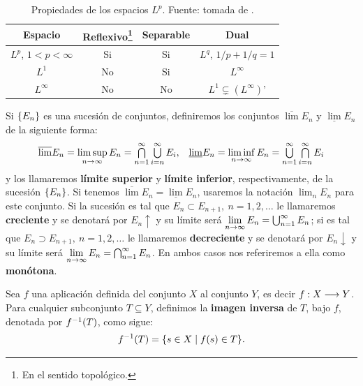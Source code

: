 
\begin{table}[ht]
\caption[título optativo de la tabla]{Propiedades de los espacios $L^p$. Fuente: tomada de \cite[Cap. 3]{Brez}.}\label{tablaLp}
\centering
\begin{tabular}{cccc}
\hline
Espacio & Reflexivo\footnote{En el sentido topológico.} & Separable & Dual \\ \hline %
$L^p$, $1<p<\infty$  & Si & Si & $L^q$, $1/p+1/q=1$ \\
$L^1$ & No & Si & $L^\infty$ \\
$L^\infty$ & No & No & $L^1 \varsubsetneq (L^\infty)’$ \\ \hline
\end{tabular}
\end{table} 

\begin{defn}\label{dfcp1}Si $\su En$ es una sucesión de
conjuntos, definiremos los conjuntos $\overline{\lim } E_n$ y
$\underline{\lim } E_n$ de la siguiente forma:
\[\begin{array}{cc}
  \overline{\lim} E_n=\limsup \limits_{n\rightarrow \infty}E_n =
  \bigcap \limits_{n=1}^\infty \Union Ein \infty ,&
  \underline{\lim} E_n=\liminf \limits_{n\rightarrow \infty}E_n =
  \bigcup \limits_{n=1}^\infty \Inter Ein \infty \\
\end{array}\] y los llamaremos \textbf{límite superior} y
\textbf{límite inferior}, respectivamente, de la sucesión $\su En$.
Si tenemos $\overline{\lim} E_n = \underline{\lim} E_n$, usaremos la
notación $\lim_n E_n$ para este conjunto. Si la sucesión es tal que
$E_n\subset E_{n+1},\ n=1,2,\dots$ le llamaremos \textbf{creciente}
y se denotará por $E_n\!\!\uparrow$ y su límite será $\lim
\limits_{n\rightarrow \infty}E_n = \union En1 \infty$; si es tal que
$E_n\supset E_{n+1},\ n=1,2,\dots$ le llamaremos
\textbf{decreciente} y se denotará por $E_n\!\!\downarrow$ y su
límite será $\lim \limits_ {n\rightarrow \infty}E_n = \inter En1
\infty$. En ambos casos nos referiremos a ella como
\textbf{monótona}.\end{defn}


\begin{defn}\label{dfcp2}Sea $f$ una aplicación definida del conjunto
$X$ al conjunto $Y$, es decir $f:X\To Y$. Para cualquier subconjunto
$T\subseteq Y$, definimos la \textbf{imagen inversa} de $T$, bajo
$f$, denotada por $\ff (T)$, como sigue:
\[\ff (T)=\{s\in X\mid f(s)\in T\}.\]\end{defn} 

